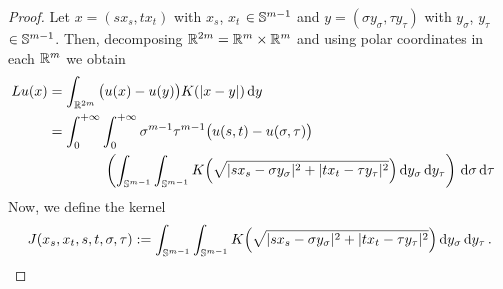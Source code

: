 \begin{proof}
%
%	
Let $x = (s x_s, t x_t)$ with $x_s$, $x_t$ $\in \mathbb{S}^{m-1}$ and $y = (\sigma y_\sigma, \tau
y_\tau)$ with $y_\sigma$, $y_\tau$ $\in \mathbb{S}^{m-1}$. Then, decomposing $\mathbb{R}^{2m} = \mathbb{R}^m \times \mathbb{R}^m$
and using polar coordinates in each $\mathbb{R}^m$ we obtain
\begin{align*}
Lu(x) &= \int_{\mathbb{R}^{2m}} \big( u(x) - u(y)\big) K( |x-y|) \,\mathrm{d} y &\\
&= \int_0^{+\infty}  \int_0^{+\infty} \sigma^{m-1} \tau^{m-1} \big(u(s,t) - u(\sigma, \tau)\big)  \\
&\quad \quad \quad \quad  \left ( {\int_{\mathbb{S}^{m-1}}  \int_{\mathbb{S}^{m-1}} K \Big( \sqrt{|sx_s - \sigma y_\sigma|^2 + |t x_t - \tau y_\tau|^2 } \Big) \,\mathrm{d} y_\sigma \,\mathrm{d} y_\tau }\right ) \,\mathrm{d} \sigma \,\mathrm{d} \tau
\end{align*}
Now, we define the kernel
\begin{equation}
\label{Eq:KernelSTVariablesProof1}
J(x_s, x_t, s,t,\sigma, \tau) := \int_{\mathbb{S}^{m-1}}  \int_{\mathbb{S}^{m-1}} K \Big( \sqrt{|sx_s - \sigma y_\sigma|^2 + |t x_t - \tau y_\tau|^2 }\Big ) \,\mathrm{d} y_\sigma \,\mathrm{d} y_\tau \,.
\end{equation}


\end{proof}
